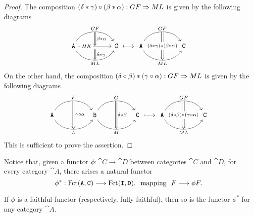 \begin{proof}
    The composition \((\delta * \gamma) \circ (\beta * \alpha): GF \Rightarrow ML\) is
    given by the following diagrams
    \[
        \begin{tikzcd}
            \cat A \ar[rr, bend left=60, "GF"{name=GF}]
            \ar[rr, "HK"{description, near start}, ""'{name=HK}]
            \ar[rr, "ML"'{name=ML}, bend right=60]
            & &\cat C
            \ar[Rightarrow, "\beta * \alpha", from=GF, to=HK]
            \ar[Rightarrow, "\delta* \gamma", from=HK, to=ML]
        \end{tikzcd}
        \longmapsto
        \begin{tikzcd}
            \cat A \ar[rr, bend left=60, "GF"{name=GF}]
            \ar[rr, "ML"'{name=ML}, bend right=60]
            & &\cat C
            \ar[Rightarrow, "(\delta * \gamma) \circ (\beta * \alpha)" description, from=GF,
                to=ML]
        \end{tikzcd}
    \]
    On the other hand, the composition \((\delta \circ \beta) * (\gamma \circ
    \alpha): GF \Rightarrow ML\) is given by the following diagrams
    \[
        \begin{tikzcd}
            \cat A
            \ar[rr, "F"{name=F}, bend left=60]
            \ar[rr, "L"'{name=L}, bend right=60]
            && \cat B
            \ar[rr, "G"{name=G}, bend left=60]
            \ar[rr, "M"'{name=M}, bend right=60]
            && \cat C
            \ar[Rightarrow, "\gamma \circ \alpha", from=F, to=L]
            \ar[Rightarrow, "\delta \circ \beta", from=G, to=M]
        \end{tikzcd}
        \longmapsto
        \begin{tikzcd}
            \cat A \ar[rr, bend left=60, "GF"{name=GF}]
            \ar[rr, "ML"'{name=ML}, bend right=60]
            & &\cat C
            \ar[Rightarrow, "(\delta \circ \beta) * (\gamma \circ \alpha)" description,
                from=GF, to=ML]
        \end{tikzcd}
    \]
    This is sufficient to prove the assertion.
\end{proof}

Notice that, given a functor \(\phi: \cat C \to \cat D\) between categories
\(\cat C\) and \(\cat D\), for every category \(\cat A\), there arises a natural
functor
\[
    \phi^{*}: \operatorname{Fct}(\texttt A, \texttt C) \longrightarrow \operatorname{Fct}(\texttt I, \texttt D)\text{,}
    \ \text{ mapping }\
    F \longmapsto \phi F.
\]

\begin{lemma}
    \label{lem:faithful-pushforward-functor}
    If \(\phi\) is a faithful functor (respectively, fully faithful), then so is the
    functor \(\phi^{*}\) for any category \(\cat A\).
\end{lemma}

